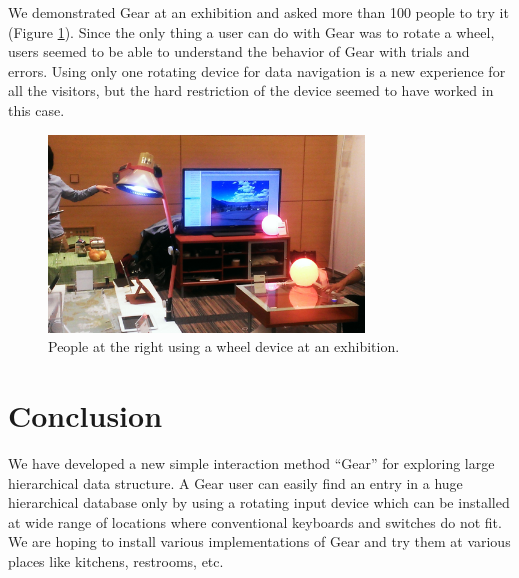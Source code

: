 \documentclass[conference]{IEEEtran}
\begin{document}
We demonstrated Gear at an exhibition
and asked more than 100 people to try it
(Figure \ref{exhibition}).
%
Since the only thing a user can do with Gear was to rotate a wheel,
users seemed to be able to understand the behavior of Gear with trials and errors.
% 
% 
Using only one rotating device for data navigation is a new experience for
all the visitors, but the hard restriction of the device seemed to have worked in this case.

\begin{figure}[H]
\centerline{\includegraphics[width=84mm,bb=0 0 527 329]{figures/c520d5dfbd06c532d48d324a7019b00c.png}}
\caption{People at the right using a wheel device at an exhibition.}
\label{exhibition}
\end{figure}


\section{Conclusion}

We have developed a new simple interaction method ``Gear'' for exploring
large hierarchical data structure.
A Gear user can easily find an entry in a huge hierarchical database
only by using a rotating input device which can be installed at
wide range of locations where conventional keyboards and switches do not fit.
We are hoping to install various implementations of Gear and try them at
various places like kitchens, restrooms, etc.

\small{


}
\end{document}
